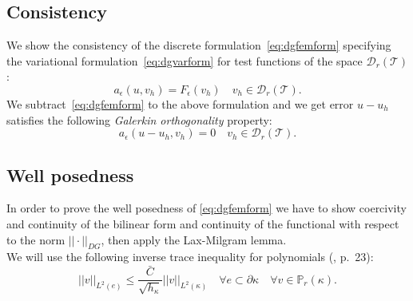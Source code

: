 \documentclass[12pt, a4paper]{article}
\theoremstyle{definition}
\theoremstyle{plain}
\theoremstyle{plain}
\theoremstyle{definition}
\begin{document}
\subsection{Consistency}
We show the consistency of the discrete formulation~\eqref{eq:dgfemform} 
specifying the variational formulation~\eqref{eq:dgvarform} for test 
functions of the space $\mathcal{D}_r(\mathcal{T})$:
\begin{equation*}
	a_\epsilon(u, v_h) = F_\epsilon(v_h) \quad v_h \in 
	\mathcal{D}_r(\mathcal{T}).
\end{equation*}
We subtract~\eqref{eq:dgfemform} to the above formulation and we get error 
$u-u_h$ satisfies the following \textit{Galerkin orthogonality} property:
\begin{equation*}
		a_\epsilon(u - u_h, v_h) = 0 \quad v_h \in 
		\mathcal{D}_r(\mathcal{T}).
\end{equation*}
\subsection{Well posedness}
In order to prove the well posedness of \eqref{eq:dgfemform} we have to show 
coercivity and continuity of the bilinear form and continuity of the functional 
with respect to the norm $||\cdot||_{DG}$, then apply the Lax-Milgram lemma.\\
We will use the following inverse trace inequality for polynomials 
(\cite{riviere}, p.~23):
\begin{equation} \label{eq:trineq}
	|\!|v|\!|_{L^2(e)} \leq \frac{\bar{C}}{\sqrt{h_\kappa}} 
	|\!|v|\!|_{L^2(\kappa)} \quad \forall e \subset \partial \kappa \quad 
	\forall 
	v \in \mathbb{P}_r(\kappa).
\end{equation}
\end{document}

